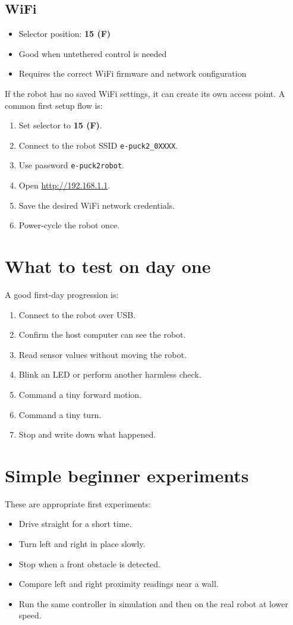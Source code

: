 \documentclass[11pt]{article}
\begin{document}
\subsection{WiFi}
\begin{itemize}
  \item Selector position: \textbf{15 (F)}
  \item Good when untethered control is needed
  \item Requires the correct WiFi firmware and network configuration
\end{itemize}

If the robot has no saved WiFi settings, it can create its own access point. A common first setup flow is:
\begin{enumerate}
  \item Set selector to \textbf{15 (F)}.
  \item Connect to the robot SSID \texttt{e-puck2\_0XXXX}.
  \item Use password \texttt{e-puck2robot}.
  \item Open \url{http://192.168.1.1}.
  \item Save the desired WiFi network credentials.
  \item Power-cycle the robot once.
\end{enumerate}

\section{What to test on day one}
A good first-day progression is:
\begin{enumerate}
  \item Connect to the robot over USB.
  \item Confirm the host computer can see the robot.
  \item Read sensor values without moving the robot.
  \item Blink an LED or perform another harmless check.
  \item Command a tiny forward motion.
  \item Command a tiny turn.
  \item Stop and write down what happened.
\end{enumerate}

\section{Simple beginner experiments}
These are appropriate first experiments:
\begin{itemize}
  \item Drive straight for a short time.
  \item Turn left and right in place slowly.
  \item Stop when a front obstacle is detected.
  \item Compare left and right proximity readings near a wall.
  \item Run the same controller in simulation and then on the real robot at lower speed.
\end{itemize}
\end{document}
